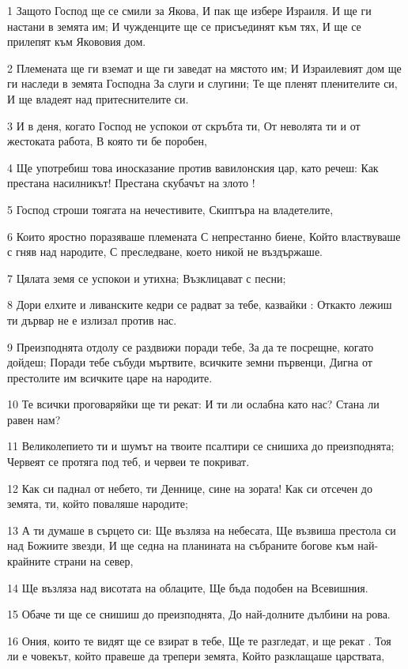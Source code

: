 \par 1 Защото Господ ще се смили за Якова, И пак ще избере Израиля. И ще ги настани в земята им; И чужденците ще се присъединят към тях, И ще се прилепят към Якововия дом.
\par 2 Племената ще ги вземат и ще ги заведат на мястото им; И Израилевият дом ще ги наследи в земята Господна За слуги и слугини; Те ще пленят пленителите си, И ще владеят над притеснителите си.
\par 3 И в деня, когато Господ не успокои от скръбта ти, От неволята ти и от жестоката работа, В която ти бе поробен,
\par 4 Ще употребиш това иносказание против вавилонския цар, като речеш: Как престана насилникът! Престана скубачът на злото !
\par 5 Господ строши тоягата на нечестивите, Скиптъра на владетелите,
\par 6 Които яростно поразяваше племената С непрестанно биене, Който властвуваше с гняв над народите, С преследване, което никой не въздържаше.
\par 7 Цялата земя се успокои и утихна; Възклицават с песни;
\par 8 Дори елхите и ливанските кедри се радват за тебе, казвайки : Откакто лежиш ти дървар не е излизал против нас.
\par 9 Преизподнята отдолу се раздвижи поради тебе, За да те посрещне, когато дойдеш; Поради тебе събуди мъртвите, всичките земни първенци, Дигна от престолите им всичките царе на народите.
\par 10 Те всички проговаряйки ще ти рекат: И ти ли ослабна като нас? Стана ли равен нам?
\par 11 Великолепието ти и шумът на твоите псалтири се снишиха до преизподнята; Червеят се протяга под теб, и червеи те покриват.
\par 12 Как си паднал от небето, ти Деннице, сине на зората! Как си отсечен до земята, ти, който поваляше народите;
\par 13 А ти думаше в сърцето си: Ще възляза на небесата, Ще възвиша престола си над Божиите звезди, И ще седна на планината на събраните богове към най-крайните страни на север,
\par 14 Ще възляза над висотата на облаците, Ще бъда подобен на Всевишния.
\par 15 Обаче ти ще се снишиш до преизподнята, До най-долните дълбини на рова.
\par 16 Ония, които те видят ще се взират в тебе, Ще те разгледат, и ще рекат . Тоя ли е човекът, който правеше да трепери земята, Който разклащаше царствата,
